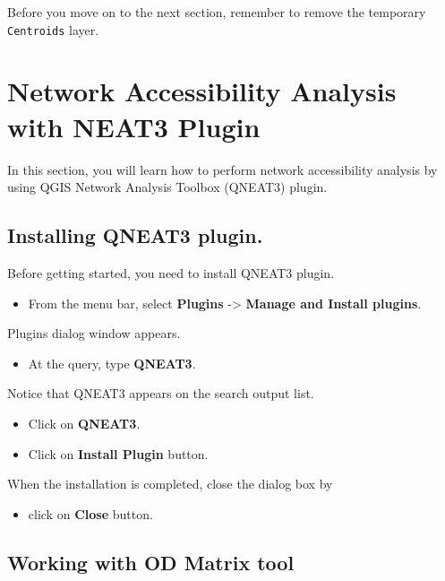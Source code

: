 \documentclass[
  letterpaper,
  DIV=11,
  numbers=noendperiod]{scrreprt}
\providecommand{\tightlist}{%
  \setlength{\itemsep}{0pt}\setlength{\parskip}{0pt}}\usepackage{longtable,booktabs,array}
\begin{document}
Before you move on to the next section, remember to remove the temporary
\texttt{Centroids} layer.

\hypertarget{network-accessibility-analysis-with-neat3-plugin}{%
\section{Network Accessibility Analysis with NEAT3
Plugin}\label{network-accessibility-analysis-with-neat3-plugin}}

In this section, you will learn how to perform network accessibility
analysis by using QGIS Network Analysis Toolbox (QNEAT3) plugin.

\hypertarget{installing-qneat3-plugin.}{%
\subsection{Installing QNEAT3 plugin.}\label{installing-qneat3-plugin.}}

Before getting started, you need to install QNEAT3 plugin.

\begin{itemize}
\tightlist
\item
  From the menu bar, select \textbf{Plugins} -\textgreater{}
  \textbf{Manage and Install plugins}.
\end{itemize}

Plugins dialog window appears.

\begin{itemize}
\tightlist
\item
  At the query, type \textbf{QNEAT3}.
\end{itemize}

Notice that QNEAT3 appears on the search output list.

\begin{itemize}
\item
  Click on \textbf{QNEAT3}.
\item
  Click on \textbf{Install Plugin} button.
\end{itemize}

When the installation is completed, close the dialog box by

\begin{itemize}
\tightlist
\item
  click on \textbf{Close} button.
\end{itemize}

\hypertarget{working-with-od-matrix-tool}{%
\subsection{Working with OD Matrix
tool}\label{working-with-od-matrix-tool}}
\end{document}
